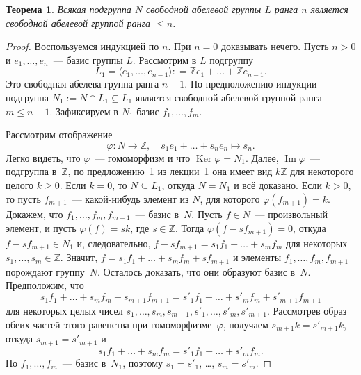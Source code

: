 \documentclass[a4paper,10pt]{amsart}
\newcommand{\Ker}{\mathop{\mathrm{Ker}}}
\renewcommand{\Im}{\mathop{\mathrm{Im}}}
\def\ZZ{{\mathbb Z}}%
\newtheorem{theorem}{Теорема}
\theoremstyle{definition}
\theoremstyle{remark}
\begin{document}
\begin{theorem}
Всякая подгруппа $N$ свободной абелевой группы $L$ ранга $n$
является свободной абелевой группой ранга $\leqslant n$.
\end{theorem}

\begin{proof}
Воспользуемся индукцией по $n$. При $n=0$ доказывать нечего. Пусть
$n>0$ и $e_1,\ldots,e_n$~--- базис группы $L$. Рассмотрим в $L$
подгруппу
$$
L_1 = \langle e_1,\ldots,e_{n-1}\rangle : = \ZZ e_1 + \ldots + \ZZ
e_{n-1}.
$$
Это свободная абелева группа ранга $n-1$. По предположению индукции
подгруппа $N_1:=N\cap L_1 \subseteq L_1$ является свободной абелевой
группой ранга $m \leqslant n-1$. Зафиксируем в $N_1$ базис $f_1,
\ldots, f_m$.

Рассмотрим отображение
$$
\varphi \colon N \to \ZZ, \quad s_1e_1 + \ldots + s_ne_n \mapsto
s_n.
$$
Легко видеть, что $\varphi$~--- гомоморфизм и что $\Ker \varphi =
N_1$. Далее, $\Im \varphi$~--- подгруппа в~$\ZZ$, по предложению~1
из лекции~1 она имеет вид $k \ZZ$ для некоторого целого $k \geqslant
0$. Если $k=0$, то $N \subseteq L_1$, откуда $N = N_1$ и всё
доказано. Если $k>0$, то пусть $f_{m+1}$~--- какой-нибудь элемент из
$N$, для которого $\varphi(f_{m+1}) = k$. Докажем, что $f_1, \ldots,
f_m, f_{m+1}$~--- базис в~$N$. Пусть $f \in N$~--- произвольный
элемент, и пусть $\varphi(f) = sk$, где $s \in \ZZ$. Тогда
$\varphi(f - sf_{m+1}) = 0$, откуда $f - sf_{m+1} \in N_1$ и,
следовательно, $f - sf_{m+1} = s_1 f_1 + \ldots + s_m f_m$ для
некоторых $s_1, \ldots, s_m \in \ZZ$. Значит, $f = s_1 f_1 + \ldots
+ s_m f_m + s f_{m+1}$ и элементы $f_1, \ldots, f_m, f_{m+1}$
порождают группу~$N$. Осталось доказать, что они образуют базис
в~$N$. Предположим, что
$$
s_1 f_1 + \ldots + s_m f_m + s_{m+1} f_{m+1} = s'_1 f_1 + \ldots +
s'_m f_m + s'_{m+1} f_{m+1}
$$
для некоторых целых чисел $s_1, \ldots, s_m, s_{m+1}, s'_1, \ldots,
s'_m, s'_{m+1}$. Рассмотрев образ обеих частей этого равенства при
гомоморфизме~$\varphi$, получаем $s_{m+1} k = s'_{m+1} k$, откуда
$s_{m+1} = s'_{m+1}$ и
$$
s_1 f_1 + \ldots + s_m f_m = s'_1 f_1 + \ldots + s'_m f_m.
$$
Но $f_1, \ldots, f_m$~--- базис в~$N_1$, поэтому $s_1 = s'_1$,
\ldots, $s_m = s'_m$.
\end{proof}
\end{document}
